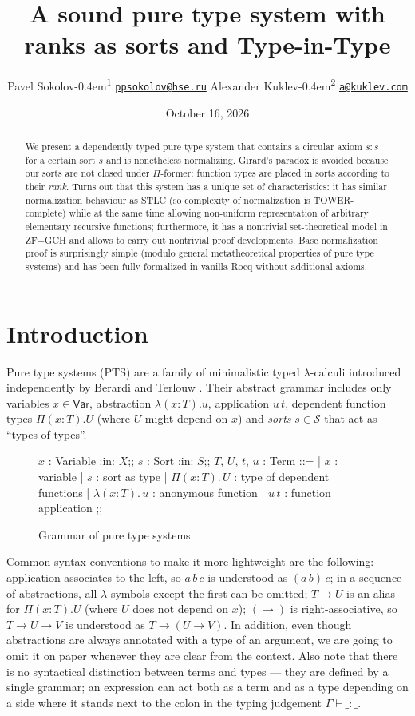 \documentclass{article}
\title{A sound pure type system with ranks as sorts and
       Type-in-Type}
\author[ ]{Pavel Sokolov\raisebox{-0.45ex}{\scriptsize\orcidlink{0009-0001-6922-2870}}\kern-0.4em\textsuperscript{1} \guilsinglleft\protect\href{mailto:ppsokolov@hse.ru}{\texttt{ppsokolov@hse.ru}}\guilsinglright
\authorcr
Alexander Kuklev\raisebox{-0.45ex}{\scriptsize\orcidlink{0009-0004-1019-4205}}\kern-0.4em\textsuperscript{2} \guilsinglleft\protect\href{mailto:a@kuklev.com}{\texttt{a@kuklev.com}}\guilsinglright}
\affil[1]{\small HSE University, Laboratory of
Theoretical Computer Science}
\affil[2]{Radboud Univ. Nijmegen, Department of
Software Science}
\date{October 16, 2026}
\theoremstyle{definition}
\theoremstyle{remark}
\begin{document}
\maketitle

\begin{abstract}
We present a dependently typed pure type system that
contains a circular axiom $s:s$ for a certain sort $s$
and is nonetheless normalizing. Girard's
paradox is avoided because our sorts are not closed
under $\Pi$-former: function types are placed in
sorts according to their \textit{rank}. Turns out that
this system has a unique set of characteristics: it has
similar normalization behaviour as STLC (so complexity
of normalization is \textsf{TOWER}-complete) while at
the same time allowing non-uniform representation of
arbitrary elementary recursive functions; furthermore,
it has a nontrivial set-theoretical model in ZF+GCH and
allows to carry out nontrivial proof developments. Base
normalization proof is surprisingly simple (modulo
general metatheoretical properties of pure type
systems) and has been fully formalized in vanilla Rocq
without additional axioms.
\end{abstract}

\section{Introduction}
Pure type systems (PTS) are a family of minimalistic
typed $\lambda$-calculi introduced independently by
Berardi \cite{berardi1988towards} and Terlouw
\cite{terlouw1989gstt}. Their abstract grammar includes
only variables $x\in\mathsf{Var}$, abstraction
$\lambda(x:T).u$, application $u\,t$, dependent
function types $\Pi(x:T).U$ (where $U$ might depend on
$x$) and \textit{sorts} $s\in\mathcal{S}$ that act as
``types of types''.

\begin{figure}[ht]
    \begin{bnf}
    $x$ : \textsf{Variable} :in: $X$;;
    $s$ : \textsf{Sort} :in: $S$;;
    $T$, $U$, $t$, $u$ : \textsf{Term} ::=
    | $x$ : variable
    | $s$ : sort as type
    | $\Pi(x\colon T).\,U$
        : type of dependent functions
    | $\lambda(x\colon T).\,u$ : anonymous function
    | $u\,t$ : function application
    ;;
    \end{bnf}
    \caption{Grammar of pure type systems}
\end{figure}

Common syntax conventions to make it more lightweight
are the following: application associates to the left,
so $a\,b\,c$ is understood as $(a\,b)\,c$; in a
sequence of abstractions, all $\lambda$ symbols except
the first can be omitted; $T\to U$ is an alias for
$\Pi(x:T).U$ (where $U$ does not depend on $x$);
$(\to)$ is right-associative, so $T\to U\to V$ is
understood as $T\to(U\to V)$. In addition, even though
abstractions are always annotated with a type of an
argument, we are going to omit it on paper whenever
they are clear from the context. Also note that there
is no syntactical distinction between terms and types
--- they are defined by a single grammar; an expression
can act both as a term and as a type depending on a
side where it stands next to the colon in the typing
judgement $\Gamma\vdash\_:\_$.
\end{document}

